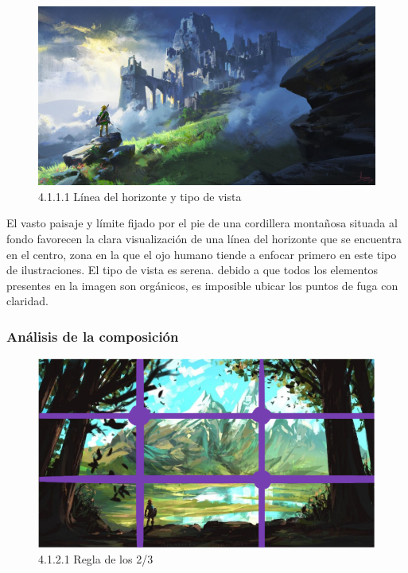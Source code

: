 \documentclass[12pt]{article}
\begin{document}
    \begin{figure}[H]
      \centering
      \includegraphics[width=\textwidth]{Nerea/6_concept_art.png}
      \caption{\small 4.1.1.1 Línea del horizonte y tipo de vista}
    \end{figure}

    El vasto paisaje y límite fijado por el pie de una cordillera montañosa situada al fondo favorecen la clara visualización de una línea del horizonte que se encuentra en el centro, zona en la que el ojo humano tiende a enfocar primero en este tipo de ilustraciones. El tipo de vista es serena.
    debido a que todos los elementos presentes en la imagen son orgánicos, es imposible ubicar los puntos de fuga con claridad.


        \subsubsection{Análisis de la composición}

        
    \begin{figure}[H]
      \centering
      \includegraphics[width=\textwidth]{images/Nerea/Nerea Zelda concept 121.PNG}
      \caption{\small 4.1.2.1 Regla de los 2/3}
    \end{figure}
\end{document}
